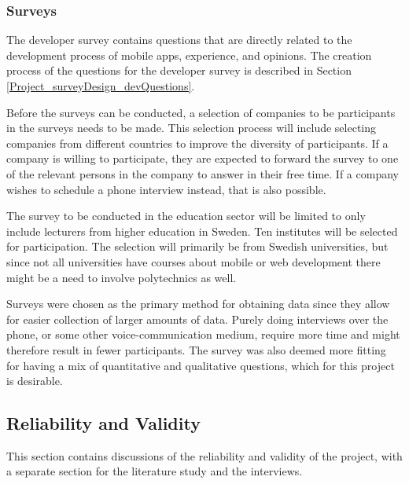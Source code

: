 \documentclass[a4paper,12pt]{article}
\begin{document}
\subsubsection{Surveys}
\label{Method_methods_surveys}
The developer survey contains questions that are directly related to the development process of mobile apps, experience, and opinions. The creation process of the questions for the developer survey is described in Section \ref{Project_surveyDesign_devQuestions}.

Before the surveys can be conducted, a selection of companies to be participants in the surveys needs to be made. This selection process will include selecting companies from different countries to improve the diversity of participants. If a company is willing to participate, they are expected to forward the survey to one of the relevant persons in the company to answer in their free time. If a company wishes to schedule a phone interview instead, that is also possible.

The survey to be conducted in the education sector will be limited to only include lecturers from higher education in Sweden. Ten institutes will be selected for participation. The selection will primarily be from Swedish universities, but since not all universities have courses about mobile or web development there might be a need to involve polytechnics as well.

Surveys were chosen as the primary method for obtaining data since they allow for easier collection of larger amounts of data. Purely doing interviews over the phone, or some other voice-communication medium, require more time and might therefore result in fewer participants. The survey was also deemed more fitting for having a mix of quantitative and qualitative questions, which for this project is desirable.

\subsection{Reliability and Validity}
\label{Method_reliabilityValidity}
This section contains discussions of the reliability and validity of the project, with a separate section for the literature study and the interviews.
\end{document}
